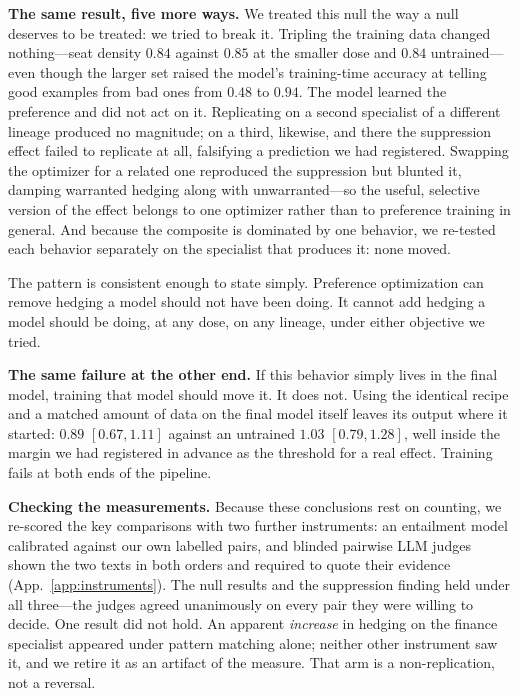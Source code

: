 \documentclass[11pt]{article}
\begin{document}
\textbf{The same result, five more ways.} We treated this null the way a null
deserves to be treated: we tried to break it. Tripling the training data
changed nothing---seat density $0.84$ against $0.85$ at the smaller dose and
$0.84$ untrained---even though the larger set raised the model's training-time
accuracy at telling good examples from bad ones from $0.48$ to $0.94$. The
model learned the preference and did not act on it. Replicating on a second
specialist of a different lineage produced no magnitude; on a third, likewise,
and there the suppression effect failed to replicate at all, falsifying a
prediction we had registered. Swapping the optimizer for a related one
reproduced the suppression but blunted it, damping warranted hedging along
with unwarranted---so the useful, selective version of the effect belongs to
one optimizer rather than to preference training in general. And because the
composite is dominated by one behavior, we re-tested each behavior separately
on the specialist that produces it: none moved.

The pattern is consistent enough to state simply. Preference optimization can
remove hedging a model should not have been doing. It cannot add hedging a
model should be doing, at any dose, on any lineage, under either objective we
tried.

\textbf{The same failure at the other end.} If this behavior simply lives in
the final model, training that model should move it. It does not. Using the
identical recipe and a matched amount of data on the final model itself leaves
its output where it started: $0.89$ $[0.67,1.11]$ against an untrained
$1.03$ $[0.79,1.28]$, well inside the margin we had registered in advance as
the threshold for a real effect. Training fails at both ends of the pipeline.

\textbf{Checking the measurements.} Because these conclusions rest on
counting, we re-scored the key comparisons with two further instruments: an
entailment model calibrated against our own labelled pairs, and blinded
pairwise LLM judges shown the two texts in both orders and required to quote
their evidence (App.~\ref{app:instruments}). The null results and the
suppression finding held under all three---the judges agreed unanimously on
every pair they were willing to decide. One result did not hold. An apparent
\emph{increase} in hedging on the finance specialist appeared under pattern
matching alone; neither other instrument saw it, and we retire it as an
artifact of the measure. That arm is a non-replication, not a reversal.
\end{document}
